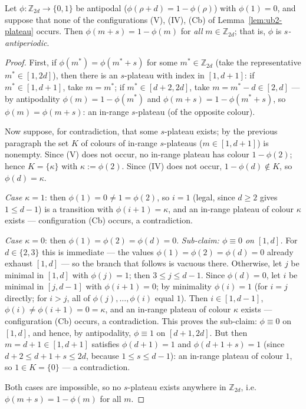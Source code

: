 \begin{lemma}\label{lem:ub2-rigidity}
Let $\phi \colon \mathbb{Z}_{2d} \to \{0,1\}$ be antipodal
($\phi(\rho + d) = 1 - \phi(\rho)$) with $\phi(1) = 0$, and suppose that
none of the configurations (V), (IV), (Cb) of
Lemma~\ref{lem:ub2-plateau} occurs. Then $\phi(m + s) = 1 - \phi(m)$ for
\emph{all} $m \in \mathbb{Z}_{2d}$; that is, $\phi$ is
\emph{$s$-antiperiodic}.
\end{lemma}

\begin{proof}
First, if $\phi(m^*) = \phi(m^* + s)$ for some $m^* \in \mathbb{Z}_{2d}$
(take the representative $m^* \in [1, 2d]$), then there is an $s$-plateau
with index in $[1, d+1]$: if $m^* \in [1, d+1]$, take $m = m^*$; if
$m^* \in [d+2, 2d]$, take $m = m^* - d \in [2, d]$ --- by antipodality
$\phi(m) = 1 - \phi(m^*)$ and $\phi(m + s) = 1 - \phi(m^* + s)$, so
$\phi(m) = \phi(m + s)$: an in-range $s$-plateau (of the opposite colour).

Now suppose, for contradiction, that some $s$-plateau exists; by the
previous paragraph the set $K$ of colours of in-range $s$-plateaus
($m \in [1, d+1]$) is nonempty. Since (V) does not occur, no in-range
plateau has colour $1 - \phi(2)$; hence $K = \{\kappa\}$ with
$\kappa := \phi(2)$. Since (IV) does not occur, $1 - \phi(d) \notin K$, so
$\phi(d) = \kappa$.

\emph{Case $\kappa = 1$}: then $\phi(1) = 0 \ne 1 = \phi(2)$, so $i = 1$
(legal, since $d \ge 2$ gives $1 \le d - 1$) is a transition with
$\phi(i + 1) = \kappa$, and an in-range plateau of colour $\kappa$ exists
--- configuration (Cb) occurs, a contradiction.

\emph{Case $\kappa = 0$}: then $\phi(1) = \phi(2) = \phi(d) = 0$.
\emph{Sub-claim: $\phi \equiv 0$ on $[1, d]$.} For $d \in \{2, 3\}$ this is
immediate --- the values $\phi(1) = \phi(2) = \phi(d) = 0$ already exhaust
$[1, d]$ --- so the branch that follows is vacuous there. Otherwise, let
$j$ be minimal in $[1, d]$ with $\phi(j) = 1$; then $3 \le j \le d - 1$.
Since $\phi(d) = 0$, let $i$ be minimal in $[j, d-1]$ with
$\phi(i + 1) = 0$; by minimality $\phi(i) = 1$ (for $i = j$ directly; for
$i > j$, all of $\phi(j), \dots, \phi(i)$ equal $1$). Then
$i \in [1, d-1]$, $\phi(i) \ne \phi(i+1) = 0 = \kappa$, and an in-range
plateau of colour $\kappa$ exists --- configuration (Cb) occurs, a
contradiction. This proves the sub-claim: $\phi \equiv 0$ on $[1, d]$, and
hence, by antipodality, $\phi \equiv 1$ on $[d+1, 2d]$. But then
$m = d + 1 \in [1, d+1]$ satisfies $\phi(d + 1) = 1$ and
$\phi(d + 1 + s) = 1$ (since $d + 2 \le d + 1 + s \le 2d$, because
$1 \le s \le d - 1$): an in-range plateau of colour $1$, so
$1 \in K = \{0\}$ --- a contradiction.

Both cases are impossible, so no $s$-plateau exists anywhere in
$\mathbb{Z}_{2d}$, i.e.\ $\phi(m + s) = 1 - \phi(m)$ for all $m$.
\end{proof}

